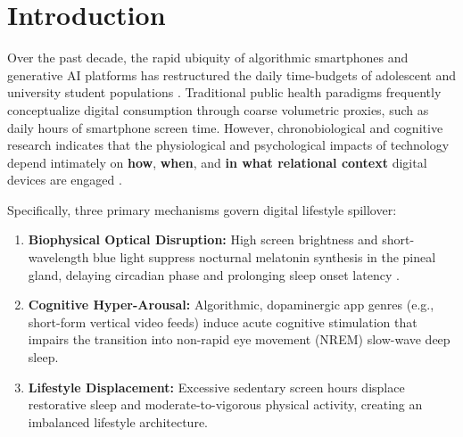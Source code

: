 \documentclass[10pt,twocolumn,a4paper]{article}
\begin{document}
\begin{abstract}
In a systematic 4-tier feature ablation experiment across linear models, Random Forests, and XGBoost, domain-engineered relational features---most notably the \textit{Screen-to-Sleep Ratio} and \textit{Active Buffer Ratio}---dominated model explainability, accounting for $56.47\%$ of total SHAP predictive attribution in Cohort B, while raw aggregate hours accounted for under $10\%$. Non-parametric bootstrap mediation analysis ($5,000$ resamples) demonstrated that sleep architecture parameters statistically mediate $45.67\%$ to $50.85\%$ of the total association between digital load and next-day fatigue in Cohort A ($ab = 0.5479$, $95\%\ \text{CI}: [0.4998, 0.5954]$), and $18.40\%$ of the relationship between digital load and student mental health in Cohort B ($ab = -0.3950$, $95\%\ \text{CI}: [-0.4321, -0.3581]$). Crucially, side-by-side benchmarking against a Gaussian noise control demonstrated that DLSM's cluster topology ($\text{ARI} > 0.98$ vs $0.269$ on noise) reflects genuine empirical structure. While cross-sectional constraints preclude causal certainty, these findings provide quantitative evidence that relational lifestyle composition contains far greater predictive signal than isolated exposure volume.
\end{abstract}

\section{Introduction}
Over the past decade, the rapid ubiquity of algorithmic smartphones and generative AI platforms has restructured the daily time-budgets of adolescent and university student populations \citep{twenge2018decreases}. Traditional public health paradigms frequently conceptualize digital consumption through coarse volumetric proxies, such as daily hours of smartphone screen time. However, chronobiological and cognitive research indicates that the physiological and psychological impacts of technology depend intimately on \textbf{how}, \textbf{when}, and \textbf{in what relational context} digital devices are engaged \citep{chang2015evening, lund2010sleep}.

Specifically, three primary mechanisms govern digital lifestyle spillover:
\begin{enumerate}
    \item \textbf{Biophysical Optical Disruption:} High screen brightness and short-wavelength blue light suppress nocturnal melatonin synthesis in the pineal gland, delaying circadian phase and prolonging sleep onset latency \citep{chang2015evening}.
    \item \textbf{Cognitive Hyper-Arousal:} Algorithmic, dopaminergic app genres (e.g., short-form vertical video feeds) induce acute cognitive stimulation that impairs the transition into non-rapid eye movement (NREM) slow-wave deep sleep.
    \item \textbf{Lifestyle Displacement:} Excessive sedentary screen hours displace restorative sleep and moderate-to-vigorous physical activity, creating an imbalanced lifestyle architecture.
\end{enumerate}
\end{document}
